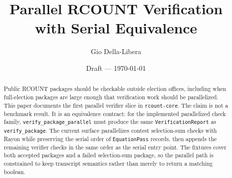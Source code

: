 \documentclass[12pt]{article}
\title{Parallel RCOUNT Verification with Serial Equivalence}
\author{Gio Della-Libera}
\date{Draft --- \today}
\begin{document}
\maketitle

\begin{abstract}
Public RCOUNT packages should be checkable outside election offices, including
when full-election packages are large enough that verification work should be
parallelized. This paper documents the first parallel verifier slice in
\texttt{rcount-core}. The claim is not a benchmark result. It is an equivalence
contract: for the implemented parallelized check family, \texttt{verify\_package\_parallel}
must produce the same \texttt{VerificationReport} as \texttt{verify\_package}.
The current surface parallelizes contest selection-sum checks with Rayon while
preserving the serial order of \texttt{EquationPass} records, then appends the
remaining verifier checks in the same order as the serial entry point. The
fixtures cover both accepted packages and a failed selection-sum package, so the
parallel path is constrained to keep transcript semantics rather than merely to
return a matching boolean.
\end{abstract}








\nocite{rcount-overview-2026,rcount-v11-2026}


\end{document}

